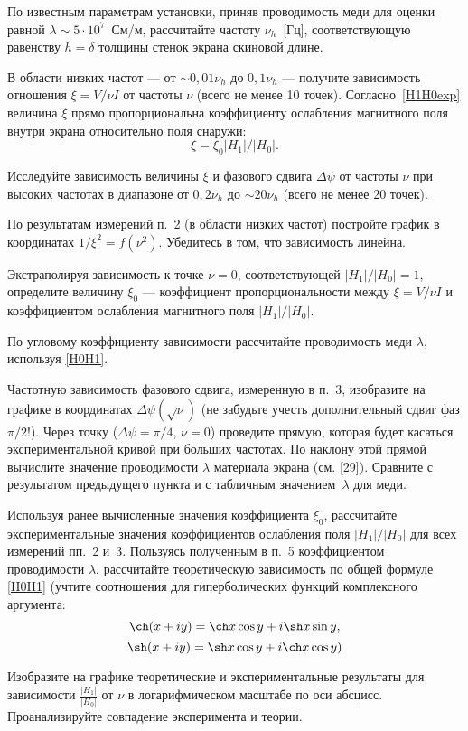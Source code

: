 \begin{lab:task}
\item По известным параметрам установки, приняв проводимость меди
для оценки равной $\lambda \sim 5\cdot 10^{7}$~См/м, рассчитайте частоту
$\nu_h$~[Гц], соответствующую равенству $h=\delta$ толщины стенок экрана 
скиновой длине.

\item В области низких частот --- от  $\sim 0,01\nu_h$ до $0,1\nu_{h}$ --- получите зависимость отношения $\xi = V/\nu I$ от
частоты $\nu$ (всего не менее 10 точек). Согласно~\eqref{H1H0exp} величина $\xi$ прямо
пропорциональна коэффициенту ослабления магнитного поля внутри 
экрана относительно поля снаружи: 
\[\xi=\xi_0 |H_1|/|H_0|.\]

\item Исследуйте зависимость величины $\xi$ 
и фазового сдвига $\Delta\psi$ от частоты $\nu$ при высоких частотах
в диапазоне от $0,2\nu_h$ до $\sim 20\nu_h$
(всего не менее 20 точек).


\item По результатам измерений п.~2 (в области низких частот)
постройте график в координатах $1/\xi^2=f(\nu^2)$.
Убедитесь в том, что зависимость линейна. 

Экстраполируя зависимость к точке $\nu=0$, соответствующей
$|H_1|/|H_0|=1$, определите величину $\xi_0$ --- коэффициент
пропорциональности между $\xi=V/\nu I$ и коэффициентом ослабления магнитного поля 
$|H_1|/|H_0|$.

По угловому коэффициенту зависимости рассчитайте проводимость меди $\lambda$,
используя \eqref{H0H1}.

\item Частотную зависимость фазового сдвига,
измеренную в п.~3, изобразите на графике в координатах 
$\Delta\psi(\sqrt{\nu})$ (не забудьте учесть дополнительный сдвиг фаз $\pi/2$!). 
Через точку ($\Delta\psi=\pi/4$, $\nu=0$) проведите прямую, 
которая будет касаться экспериментальной кривой при больших частотах. 
По наклону этой прямой вычислите значение проводимости $\lambda$ материала экрана
(см. \eqref{29}). 
Сравните с результатом предыдущего пункта и с табличным значением~$\lambda$ для меди.

\item Используя ранее вычисленные значения коэффициента $\xi_0$,
рассчитайте экспериментальные значения коэффициентов 
ослабления поля $|H_1|/|H_0|$ для всех измерений пп.~2 и~3.
Пользуясь полученным в п.~5 коэффициентом проводимости $\lambda$,
рассчитайте теоретическую зависимость по общей формуле \eqref{H0H1}
(учтите соотношения для гиперболических функций комплексного аргумента: 
\[\ch(x+iy) = \ch x \cos y + i \sh x \sin y,
\] 
\[\sh(x+iy) = \sh x \cos y + i \ch x \cos y)
\]

Изобразите на графике теоретические и экспериментальные 
результаты для зависимости $\frac{|H_1|}{|H_0|}$ от $\nu$
в логарифмическом масштабе по оси абсцисс.
Проанализируйте совпадение эксперимента и теории.


\end{lab:task}


